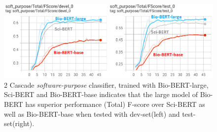 \begin{figure}[htbp]
	\centering
	\includegraphics[width=1\textwidth]{4.graphics/figures/ch_6/6.BIoBERT_vs_SCIBERT_2LAYER_Classifier/HD/BIobert-large-small-cybert}
	\caption{2 Cascade \emph{software-purpose} classifier, trained with Bio-BERT-large, Sci-BERT and Bio-BERT-base indicates that the large model of Bio-BERT has superior performance (Total) F-score over Sci-BERT as well as Bio-BERT-base when tested with dev-set(left) and test-set(right).}
	\label{fig:chapter06:with}
\end{figure}






















